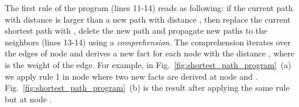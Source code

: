 \begin{dblfig}
\vspace*{-2ex}
\begin{center}
  \hspace{0.4cm}
  \hspace{0.4cm}
\end{center}
\vspace*{-1ex}
\end{dblfig}

The first rule of the program (lines 11-14) reads as following: if the current
 path  with distance  is larger
than a new path  with distance , then replace the
current shortest path with , delete the new  path and
propagate new paths to the neighbors (lines 13-14) using a \emph{comprehension}.
The comprehension iterates over the edges of node  and derives a new
 fact for each node  with the distance ,
where  is the weight of the edge. For
example, in Fig.~\ref{fig:shortest_path_program}~(a) we apply rule 1 in node
 where two new  facts are derived at node 
and . Fig.~\ref{fig:shortest_path_program}~(b) is the result after
applying the same rule but at node .

